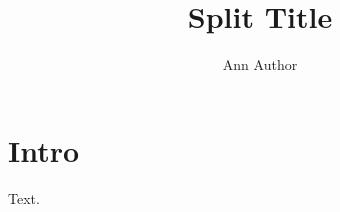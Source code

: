 \documentclass{article}
\title{Split Title}
\author{Ann Author}
\begin{document}
\begin{center}\par{}\end{center}
\maketitle
\section{Intro}
Text.
\end{document}
